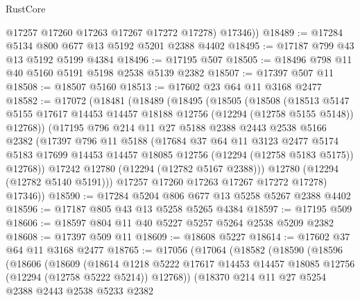 \begin{lexlean}{RustCore}
\begin{coremodule}
          @17257
          @17260
          @17263
          @17267
          @17272
          @17278)
        @17346))
@18489 := @17284 @5134 @800 @677 @13 @5192 @5201 @2388 @4402
@18495 := @17187 @799 @43 @13 @5192 @5199 @4384
@18496 := @17195 @507
@18505 := @18496 @798 @11 @40 @5160 @5191 @5198 @2538 @5139 @2382
@18507 := @17397 @507 @11
@18508 := @18507 @5160
@18513 := @17602 @23 @64 @11 @3168 @2477
@18582 := @17072
    (@18481
      (@18489
        (@18495
          (@18505
            (@18508
              (@18513
                @5147
                @5155
                @17617
                @14453
                @14457
                @18188
                @12756
                (@12294 (@12758 @5155 @5148))
                @12768))
            (@17195
              @796
              @214
              @11
              @27
              @5188
              @2388
              @2443
              @2538
              @5166
              @2382
              (@17397
                @796
                @11
                @5188
                (@17684
                  @37
                  @64
                  @11
                  @3123
                  @2477
                  @5174
                  @5183
                  @17699
                  @14453
                  @14457
                  @18085
                  @12756
                  (@12294 (@12758 @5183 @5175))
                  @12768))
              @17242
              @12780
              (@12294 (@12782 @5167 @2388)))
            @12780
            (@12294 (@12782 @5140 @5191)))
          @17257
          @17260
          @17263
          @17267
          @17272
          @17278)
        @17346))
@18590 := @17284 @5204 @806 @677 @13 @5258 @5267 @2388 @4402
@18596 := @17187 @805 @43 @13 @5258 @5265 @4384
@18597 := @17195 @509
@18606 := @18597 @804 @11 @40 @5227 @5257 @5264 @2538 @5209 @2382
@18608 := @17397 @509 @11
@18609 := @18608 @5227
@18614 := @17602 @37 @64 @11 @3168 @2477
@18765 := @17056
    (@17064
      (@18582
        (@18590
          (@18596
            (@18606
              (@18609
                (@18614
                  @1218
                  @5222
                  @17617
                  @14453
                  @14457
                  @18085
                  @12756
                  (@12294 (@12758 @5222 @5214))
                  @12768))
              (@18370
                @214
                @11
                @27
                @5254
                @2388
                @2443
                @2538
                @5233
                @2382

\end{coremodule}
\end{lexlean}
